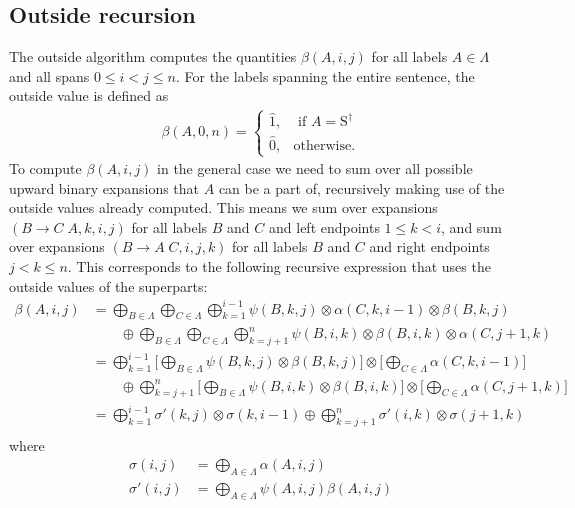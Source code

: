 \subsection{Outside recursion}
  The outside algorithm computes the quantities $\beta(A,i,j)$ for all labels $A \in \Lambda$ and all spans $0 \leq i < j \leq n$. For the labels spanning the entire sentence, the outside value is defined as
  \begin{align*}
    \beta(A, 0, n) =
    \begin{cases}
      \hat{1}, & \text{ if } A = \text{S}^{\dagger}  \\
      \hat{0}, & \text{otherwise}.
    \end{cases}
  \end{align*}
  To compute $\beta(A, i, j)$ in the general case we need to sum over all possible upward binary expansions that $A$ can be a part of, recursively making use of the outside values already computed. This means we sum over expansions $(B \to C \; A, k, i, j)$ for all labels $B$ and $C$ and left endpoints $1 \leq k < i$, and sum over expansions $(B \to A \; C, i, j, k)$ for all labels $B$ and $C$ and right endpoints $j < k \leq n$. This corresponds to the following recursive expression that uses the outside values of the superparts:
  \begin{align*}
    \beta(A, i, j)
      &= \bigoplus_{B \in \Lambda} \bigoplus_{C \in \Lambda} \bigoplus_{k=1}^{i-1} \psi(B, k, j) \otimes \alpha(C, k, i-1) \otimes \beta(B, k, j) \\
        &\qquad \oplus \bigoplus_{B \in \Lambda} \bigoplus_{C \in \Lambda} \bigoplus_{k=j+1}^{n} \psi(B, i, k) \otimes \beta(B, i, k) \otimes \alpha(C, j+1, k) \\
      &=  \bigoplus_{k=1}^{i-1}  \Bigg[ \bigoplus_{B \in \Lambda} \psi(B, k, j)  \otimes \beta(B, k, j) \Bigg] \otimes \Bigg[ \bigoplus_{C \in \Lambda} \alpha(C, k, i-1) \Bigg] \\
        &\qquad \oplus \bigoplus_{k=j+1}^{n}  \Bigg[ \bigoplus_{B \in \Lambda}  \psi(B, i, k) \otimes \beta(B, i, k) \Bigg] \otimes  \Bigg[  \bigoplus_{C \in \Lambda} \alpha(C, j+1, k) \Bigg] \\
      &=  \bigoplus_{k=1}^{i-1}  \sigma'(k, j) \otimes \sigma(k, i-1) \oplus \bigoplus_{k=j+1}^{n} \sigma'(i, k) \otimes  \sigma(j+1, k) \\
  \end{align*}
  where
  \begin{align*}
      \sigma(i, j) &= \bigoplus_{A \in \Lambda} \alpha(A, i, j) \\
      \sigma'(i, j) &= \bigoplus_{A \in \Lambda} \psi(A, i, j) \beta(A, i, j)
  \end{align*}

